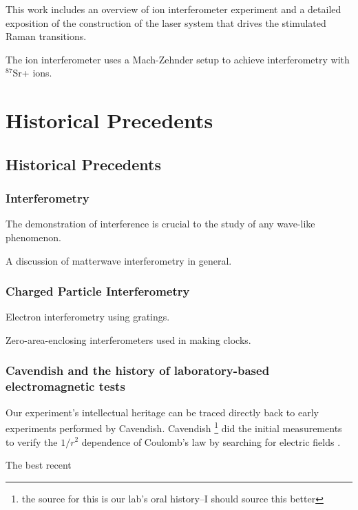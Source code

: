 

This work includes an overview of ion interferometer experiment and a detailed exposition of the construction of the laser system that drives the stimulated Raman transitions.

The ion interferometer uses a Mach-Zehnder setup to achieve interferometry with $^{87}$Sr+ ions.


\chapter{Historical Precedents}
\section{Historical Precedents}
 \subsection{Interferometry}
  The demonstration of interference is crucial to the study of any wave-like phenomenon. 

  A discussion of matterwave interferometry in general. 
  \subsection{Charged Particle Interferometry}
  Electron interferometry using gratings. 

Zero-area-enclosing interferometers used in making clocks. 
\subsection{Cavendish and the history of laboratory-based electromagnetic tests}
  Our experiment's intellectual heritage can be traced directly back to early experiments performed by Cavendish. Cavendish \footnote{the source for this is our lab's oral history--I should source this better} did the initial measurements to verify the $1/r^2$ dependence of Coulomb's law by searching for electric fields \cite{jackson}. 

The best recent
